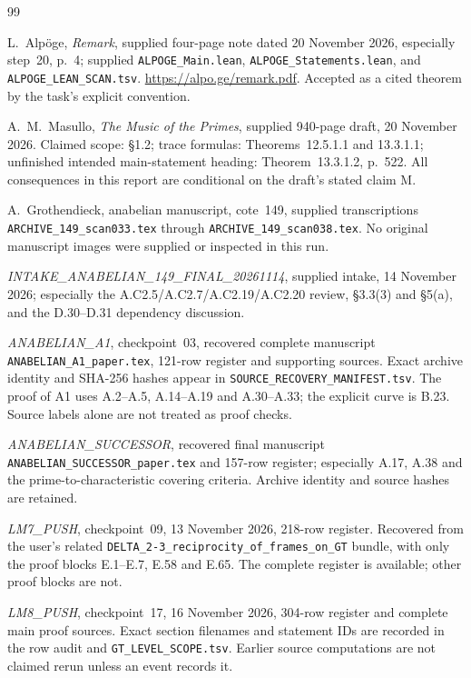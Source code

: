 \documentclass[11pt,a4paper]{article}
\begin{document}
\begin{thebibliography}{99}

L.~Alp\"oge, \emph{Remark}, supplied four-page note dated 20 November
2026, especially step~20, p.~4; supplied
\texttt{ALPOGE\_Main.lean}, \texttt{ALPOGE\_Statements.lean}, and
\texttt{ALPOGE\_LEAN\_SCAN.tsv}. \url{https://alpo.ge/remark.pdf}.
Accepted as a cited theorem by the task's explicit convention.

A.~M.~Masullo, \emph{The Music of the Primes}, supplied 940-page draft,
20 November 2026. Claimed scope: \S1.2; trace formulas:
Theorems~12.5.1.1 and 13.3.1.1; unfinished intended main-statement
heading: Theorem~13.3.1.2, p.~522. All consequences in this report
are conditional on the draft's stated claim M.

A.~Grothendieck, anabelian manuscript, cote~149, supplied
transcriptions \texttt{ARCHIVE\_149\_scan033.tex} through
\texttt{ARCHIVE\_149\_scan038.tex}. No original manuscript images
were supplied or inspected in this run.

\emph{INTAKE\_ANABELIAN\_149\_FINAL\_20261114}, supplied intake,
14 November 2026; especially the A.C2.5/A.C2.7/A.C2.19/A.C2.20
review, \S3.3(3) and \S5(a), and the D.30--D.31 dependency discussion.

\emph{ANABELIAN\_A1}, checkpoint~03, recovered complete manuscript
\texttt{ANABELIAN\_A1\_paper.tex}, 121-row register and supporting
sources. Exact archive identity and SHA-256 hashes appear in
\texttt{SOURCE\_RECOVERY\_MANIFEST.tsv}. The proof of A1 uses
A.2--A.5, A.14--A.19 and A.30--A.33; the explicit curve is B.23.
Source labels alone are not treated as proof checks.

\emph{ANABELIAN\_SUCCESSOR}, recovered final manuscript
\texttt{ANABELIAN\_SUCCESSOR\_paper.tex} and 157-row register;
especially A.17, A.38 and the prime-to-characteristic covering
criteria. Archive identity and source hashes are retained.

\emph{LM7\_PUSH}, checkpoint~09, 13 November 2026, 218-row register.
Recovered from the user's related
\texttt{DELTA\_2-3\_reciprocity\_of\_frames\_on\_GT} bundle,
with only the proof blocks E.1--E.7, E.58 and E.65.
The complete register is available; other proof blocks are not.

\emph{LM8\_PUSH}, checkpoint~17, 16 November 2026,
304-row register and complete main proof sources. Exact section
filenames and statement IDs are recorded in the row audit and
\texttt{GT\_LEVEL\_SCOPE.tsv}. Earlier source computations are not
claimed rerun unless an event records it.


\end{thebibliography}
\end{document}
